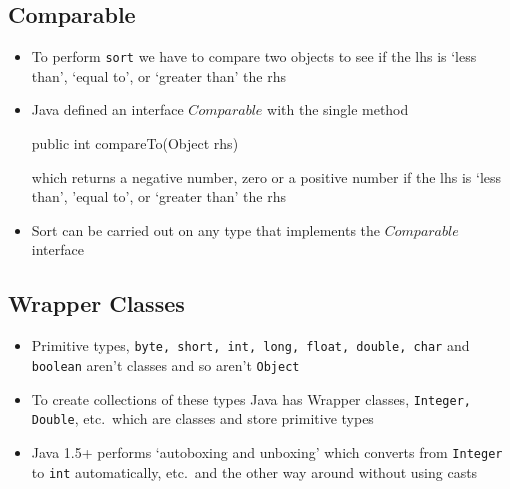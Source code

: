 
\begin{slide}
\section{Comparable}

\begin{PauseHighLight}
  \begin{itemize}
  \item To perform \texttt{sort} we have to compare two objects to see if
    the lhs is `less than', `equal to', or `greater than' the rhs\pause
  \item Java defined an interface \jl$Comparable$ with the single method
    \begin{java}
      public int compareTo(Object rhs)
    \end{java}
    which returns a negative number, zero or a positive number if the
    lhs is `less than', 'equal to', or `greater than' the rhs\pause
  \item Sort can be carried out on any type that implements the
    \jl$Comparable$ interface\pause
  \end{itemize}
\end{PauseHighLight}
\end{slide}


\begin{slide}
\section{Wrapper Classes}

\begin{PauseHighLight}
  \begin{itemize}
  \item Primitive types, \texttt{byte, short, int, long, float, double,
      char} and \texttt{boolean} aren't classes and so aren't
    \texttt{Object}\pause
  \item To create collections of these types Java has Wrapper classes,
    \texttt{Integer, Double}, etc.\ which are classes and store
    primitive types\pause
  \item Java 1.5+ performs `autoboxing and unboxing' which converts from
    \texttt{Integer} to \texttt{int} automatically, etc.\ and the other
    way around without using casts\pause
  \end{itemize}
\end{PauseHighLight}
\end{slide}

